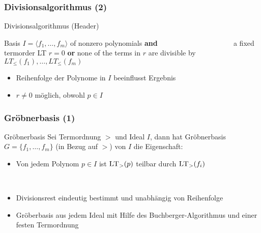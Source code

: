 \documentclass{beamer}
\begin{document}
\begin{frame}[fragile]
\frametitle{Divisionsalgorithmus (2)}




\begin{algorithm}[H]
\caption{Divisionsalgorithmus (Header) }

\begin{algorithmic}[1]

\Require Basis $I = \langle f_{1}, \dots, f_{m}\rangle$ of nonzero polynomials \textbf{and} ~~~~~~~~~~~~~~~~~~~~ a fixed termorder \textsc{LT}  
\Ensure $r=0$ \textbf{or} none of the terms in $r$ are divisible by $ LT_{\leq}\left( f_{1}\right) , \dots , LT_{\leq} \left( f_{m}\right) $

\end{algorithmic}
\end{algorithm}


\begin{itemize}
\item Reihenfolge der Polynome in $I$ beeinflusst Ergebnis
\item $r \neq 0$ möglich, obwohl $p \in I$ 
\end{itemize}


\end{frame}




\begin{frame}[fragile]
\frametitle{Gröbnerbasis (1)}


\begin{block}{Gröbnerbasis  }
Sei Termordnung $>$ und Ideal $I$, dann hat Gröbnerbasis $G = \{f_{1}, \ldots, f_{m} \}$ (in Bezug auf $>$) von $I$ die Eigenschaft: 
\begin{itemize}
\item Von jedem Polynom $p \in I$ ist $\textsc{LT}_{>}(p)$ teilbar durch $\textsc{LT}_{>}(f_{i})$  
\end{itemize} 
\end{block}

~\\
\begin{itemize}
\item Divisionsrest eindeutig bestimmt und unabhängig von Reihenfolge
~\\
\item Gröberbasis aus jedem Ideal mit Hilfe des Buchberger-Algorithmus und einer festen Termordnung 
\end{itemize}



\end{frame}
\end{document}
